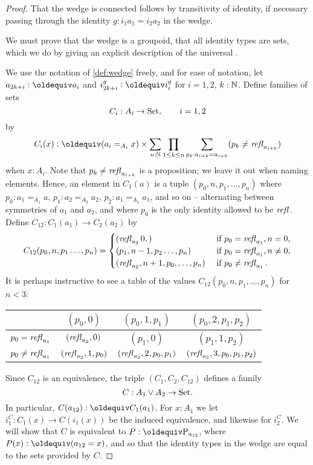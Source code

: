 \begin{proof}
That the wedge is connected follows by transitivity of identity, if necessary passing through the identity $g:i_1a_1=i_2a_2$ in the wedge.

We must prove that the wedge is a groupoid, \ie that all identity types are sets, which we do by giving an explicit description of the universal \covering. 

 We use the notation of \cref{def:wedge} freely, and for ease of notation, let $a_{2k+i}\defequi a_i$ and $i_{2k+i}^g\defequi i_i^g$ for $i=1,2$, $k:\mathbb{N}$.  %
Define families of sets
$$C_i:A_i\to\mathord{\mathrm{Set}},\qquad i=1,2$$
by 
$$C_i(x)\defequi(a_i=_{A_i}x)\times\sum_{n:\NN}\prod_{1\leq k\leq n}\sum_{p_k:a_{i+k}=%
  a_{i+k}}(p_k\neq\refl {a_{i+k}})$$
when $x:A_i$.  Note that $p_k\neq\mathop{{\it refl}_{a_{i+k}}}$  is a proposition; we leave it out when naming elements. Hence, an element in $C_1(a)$ is a tuple
$(p_0,n,p_1,\dots,p_n)$ where $p_0:a_1=_{A_1}a$, $p_1:a_2=_{A_2}a_2$, $p_2:a_1=_{A_1}a_1$, and so on -- alternating between symmetries of $a_1$ and $a_2$, and where $p_0$ is the only identity allowed to be $\mathop{{\it refl}_{}}$. Define $C_{12}:C_1(a_1)\to C_2(a_2)$ by
$$C_{12}(p_0,n,p_1\dots,p_n)=
\begin{cases}
  (\mathop{{\it refl}_{a_2}}0,)&\text{ if }p_0=\mathop{{\it refl}_{a_1}}, n=0,\\
  (p_1,n-1,p_2\dots,p_n)& \text{ if }p_0=\mathop{{\it refl}_{a_1}},n\neq0,\\
  (\mathop{{\it refl}_{a_2}},n+1,p_0,\dots,p_n)& \text{ if }p_0\neq\mathop{{\it refl}_{a_1}}.
\end{cases}
$$
It is perhaps instructive to see a table of the values $C_{12}(p_0,n,p_1,\dots,p_n)$ for $n<3$:
\begin{center}
  \begin{tabular}{r|c cc}
    &$(p_0,0)$&$(p_0,1,p_1)$&$(p_0,2,p_1,p_2)$\\
    \hline
    $p_0=\mathop{{\it refl}_{a_1}}$&$(\mathop{{\it refl}_{a_2}},0)$&$(p_1,0)$&$(p_1,1,p_2)$\\
    $p_0\neq\mathop{{\it refl}_{a_1}}$&$(\mathop{{\it refl}_{a_2}},1,p_0)$&$(\mathop{{\it refl}_{a_2}},2,p_0,p_1)$&$(\mathop{{\it refl}_{a_2}},3,p_0,p_1,p_2)$
  \end{tabular}
\end{center}
Since $C_{12}$ is an equivalence, the triple $(C_1,C_2,C_{12})$ defines a family
$$C:A_1\vee A_2\to\mathord{\mathrm{Set}}.$$
In particular, $C(a_{12})\defequi C_1(a_1)$.
For $x:A_1$ we let $i^C_1:C_1(x)\to C(i_1(x))$ be the induced equivalence, and likewise for $i^C_2$.
We will show that $C$ is equivalent to $P\defequi \pathsp{a_{12}}$, where $P(x)\defequi(a_{12}=x)$, and so that the identity types in the wedge are equal to the sets provided by $C$.


\end{proof}
